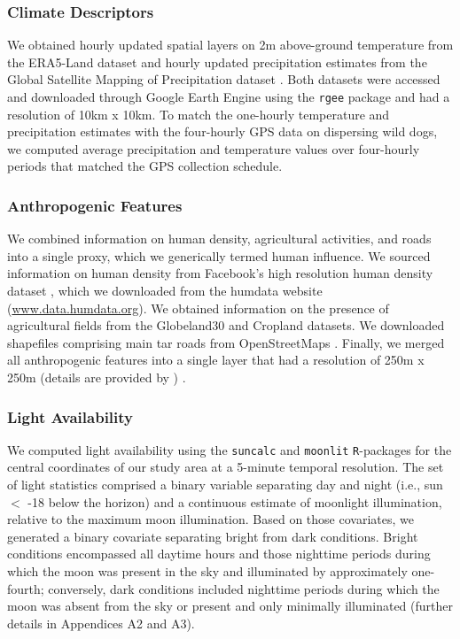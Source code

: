 \documentclass[abstract=on,10pt,a4paper,bibliography=totocnumbered]{article}
\begin{document}
\subsubsection{Climate Descriptors}

We obtained hourly updated spatial layers on 2m above-ground temperature from
the ERA5-Land dataset \citep{Munoz-Sabater.2021} and hourly updated
precipitation estimates from the Global Satellite Mapping of Precipitation
dataset \citep{Kubota.2020}. Both datasets were accessed and downloaded through
Google Earth Engine \citep{Gorelick.2017} using the \texttt{rgee} package
\citep{Aybar.2024} and had a resolution of 10km x 10km. To match the one-hourly
temperature and precipitation estimates with the four-hourly GPS data on
dispersing wild dogs, we computed average precipitation and temperature values
over four-hourly periods that matched the GPS collection schedule.

\subsubsection{Anthropogenic Features}

We combined information on human density, agricultural activities, and roads
into a single proxy, which we generically termed human influence. We sourced
information on human density from Facebook's high resolution human density
dataset \citep{Tiecke.2017}, which we downloaded from the humdata website
(\url{www.data.humdata.org}). We obtained information on the presence of
agricultural fields from the Globeland30 \citep{Chen.2015} and Cropland
\citep{Xiong.2017} datasets. We  downloaded shapefiles comprising main tar roads
from OpenStreetMaps \citep{OpenStreetMapContributors.2017}. Finally, we merged
all anthropogenic features into a single layer that had a resolution of 250m x
250m (details are provided by \citealp{Hofmann.2021}) .

\subsubsection{Light Availability}

We computed light availability using the \texttt{suncalc} and \texttt{moonlit}
\texttt{R}-packages \citep{Thieurmel.2022, Smielak.2023} for the central
coordinates of our study area at a 5-minute temporal resolution. The set of
light statistics comprised a binary variable separating day and night (i.e., sun
$<$ -18 \degree below the horizon) and a continuous estimate of moonlight
illumination, relative to the maximum moon illumination. Based on those
covariates, we generated a binary covariate separating bright from dark
conditions. Bright conditions encompassed all daytime hours and those nighttime
periods during which the moon was present in the sky and illuminated by
approximately one-fourth; conversely, dark conditions included nighttime periods
during which the moon was absent from the sky or present and only minimally
illuminated (further details in Appendices A2 and A3).
\end{document}
